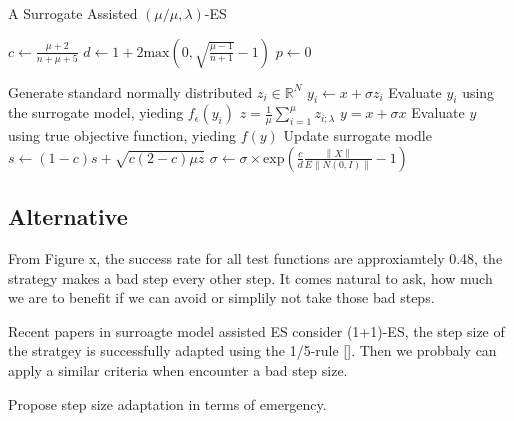 \begin{algorithm}
\caption{A Surrogate Assisted $(\mu/\mu,\lambda)$-ES}
\label{alg}
\begin{algorithmic}[1]
\STATE $c \leftarrow  \frac{\mu +2}{n+\mu+5}$ 
\STATE $d \leftarrow 1 + 2 \text{max}(0, \sqrt{\frac{\mu - 1}{n+1} } - 1 ) $
\STATE $p \leftarrow 0$

		\STATE Generate standard normally distributed $z_i \in \mathbb{R}^N $
		\STATE $y_i \leftarrow x + \sigma z_i$
		\STATE Evaluate $y_i$ using the surrogate model, yieding $f_{\epsilon}(y_i)$
	\ENDFOR
	\STATE $z = \frac{1}{\mu} \sum_{i=1}^{\mu} z_{i;\lambda}$
	\STATE $y = x + \sigma x$
	\STATE Evaluate $y$ using true objective function, yieding $f(y)$
	\STATE Update surrogate modle 
	\STATE $s \leftarrow (1-c)s + \sqrt{ c(2-c) \mu z}$
	\STATE $\sigma \leftarrow \sigma \times \text{exp} \left(\frac{c}{d} \frac{\left\lVert X \right\rVert} { E \left\lVert N(0,I) \right\rVert} -1 \right )$
		

\ENDWHILE

\end{algorithmic}
\end{algorithm}




\subsection{Alternative}

From Figure x, the success rate for all test functions are approxiamtely 0.48, the strategy makes a bad step every other step. It comes natural to ask, how much we are to benefit if we can avoid or simplily not take those bad steps.  


Recent papers in surroagte model assisted ES consider (1+1)-ES, the step size of the stratgey is successfully adapted using the 1/5-rule []. Then we probbaly can apply a similar criteria when encounter a bad step size. 

Propose step size adaptation in terms of emergency.

